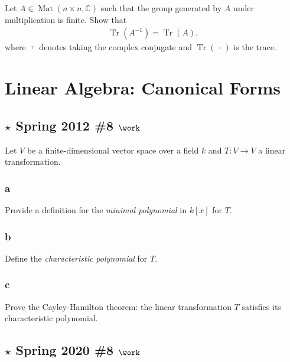 Let \(A\in \operatorname{Mat}(n\times n, {\mathbb{C}})\) such that the
group generated by \(A\) under multiplication is finite. Show that
\begin{align*}
\operatorname{Tr}(A^{-1}) ={\overline{{\operatorname{Tr}(A) }}}
,\end{align*}
where \({\overline{{{\,\cdot\,}}}}\) denotes taking the complex
conjugate and \(\operatorname{Tr}({\,\cdot\,})\) is the trace.

\hypertarget{linear-algebra-canonical-forms}{%
\section{Linear Algebra: Canonical
Forms}\label{linear-algebra-canonical-forms}}

\hypertarget{star-spring-2012-8-work}{%
\subsection{\texorpdfstring{\(\star\) Spring 2012 \#8
\(\work\)}{\textbackslash star Spring 2012 \#8 \textbackslash work}}\label{star-spring-2012-8-work}}

Let \(V\) be a finite-dimensional vector space over a field \(k\) and
\(T:V\to V\) a linear transformation.

\hypertarget{a-107}{%
\subsubsection{a}\label{a-107}}

Provide a definition for the \emph{minimal polynomial} in \(k[x]\) for
\(T\).

\hypertarget{b-97}{%
\subsubsection{b}\label{b-97}}

Define the \emph{characteristic polynomial} for \(T\).

\hypertarget{c-58}{%
\subsubsection{c}\label{c-58}}

Prove the Cayley-Hamilton theorem: the linear transformation \(T\)
satisfies its characteristic polynomial.

\hypertarget{star-spring-2020-8-work}{%
\subsection{\texorpdfstring{\(\star\) Spring 2020 \#8
\(\work\)}{\textbackslash star Spring 2020 \#8 \textbackslash work}}\label{star-spring-2020-8-work}}

